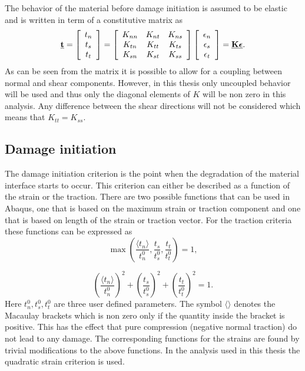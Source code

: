 \documentclass[grain_boundary_law.tex]{subfiles}
\begin{document}
The behavior of the material before damage initiation is assumed to be elastic and is written in term of a constitutive matrix as
 \[ \vec{t} = 
 \left[
\begin{array}{c c c}
t_n\\
t_s\\
t_t \\
\end{array} \right]
=
\left[
\begin{array}{c c c}
K_{nn} & K_{nt} & K_{ns} \\
K_{tn} & K_{tt} & K_{ts} \\
K_{sn} & K_{st} & K_{ss} \\
\end{array} \right]
 \left[
\begin{array}{c c c}
\epsilon_n\\
\epsilon_s\\
\epsilon_t \\
\end{array} \right]
= \vec{K} \vec{\epsilon}.
\]
%
As can be seen from the matrix it is possible to allow for a coupling between normal and shear components. However, in this thesis only uncoupled behavior will be used and thus only the diagonal elements of $K$ will be non zero in this analysis. Any difference between the shear directions will not be considered which means that $K_{tt} = K_{ss}$.

\subsection{Damage initiation}

The damage initiation criterion is the point when the degradation of the material interface starts to occur. This criterion can either be described as a function of the strain or the traction. There are two possible functions that can be used in Abaqus, one that is based on the maximum strain or traction component and one that is based on length of the strain or traction vector. For the traction criteria these functions can be expressed as
%
\[ \max \left( \frac{\langle t_n \rangle}{t_n^0} ,\frac{ t_s }{t_s^0} ,  \frac{ t_t }{t_t^0}  \right) = 1,  \] 

\[  \left( \frac{\langle t_n \rangle}{t_n^0} \right)^2 +   \left( \frac{ t_s }{t_s^0} \right)^2 +   \left( \frac{ t_t }{t_t^0} \right)^2 = 1.   \]	
%
Here $t_n^0, t_s^0, t_t^0$ are three user defined parameters. The symbol $\langle \rangle$ denotes the Macaulay brackets which is non zero only if the quantity inside the bracket is positive. This has the effect that pure compression (negative normal traction) do not lead to any damage. The corresponding functions for the strains are found by trivial modifications to the above functions. In the analysis used in this thesis the quadratic strain criterion is used. 
\end{document}
